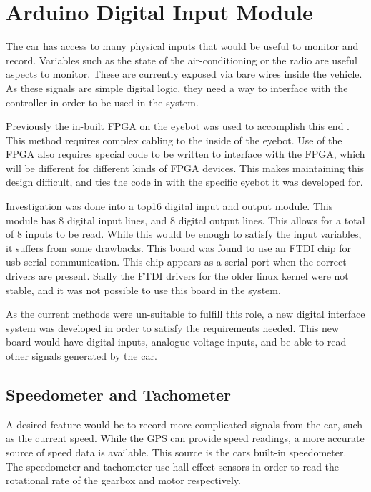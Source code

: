 

\section{Arduino Digital Input Module}
\label{sec:arduino}

The car has access to many physical inputs that would be useful to monitor and record. Variables such as the state of the air-conditioning or the radio are useful aspects to monitor. These are currently exposed via bare wires inside the vehicle. As these signals are simple digital logic, they need a way to interface with the controller in order to be used in the system.

Previously the in-built FPGA on the eyebot was used to accomplish this end \cite{varma_thesis}. This method requires complex cabling to the inside of the eyebot. Use of the FPGA also requires special code to be written to interface with the FPGA, which will be different for different kinds of FPGA devices. This makes maintaining this design difficult, and ties the code in with the specific eyebot it was developed for.

Investigation was done into a top16 digital input and output module. This module has 8 digital input lines, and 8 digital output lines. This allows for a total of 8 inputs to be read. While this would be enough to satisfy the input variables, it suffers from some drawbacks. This board was found to use an FTDI chip for usb serial communication. This chip appears as a serial port when the correct drivers are present. Sadly the FTDI drivers for the older linux kernel were not stable, and it was not possible to use this board in the system.

As the current methods were un-suitable to fulfill this role, a new digital interface system was developed in order to satisfy the requirements needed. This new board would have digital inputs, analogue voltage inputs, and be able to read other signals generated by the car.

\subsection{Speedometer and Tachometer}

A desired feature would be to record more complicated signals from the car, such as the current speed. While the GPS can provide speed readings, a more accurate source of speed data is available. This source is the cars built-in speedometer. The speedometer and tachometer use hall effect sensors in order to read the rotational rate of the gearbox and motor respectively. 

